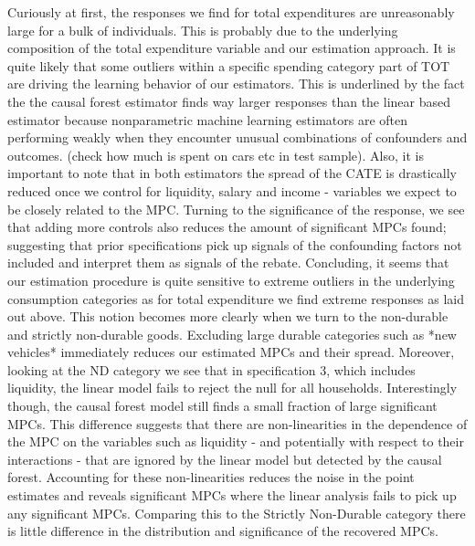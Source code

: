 Curiously at first, the responses we find for total expenditures are unreasonably large for a bulk of individuals. This is probably due to the underlying composition of the total expenditure variable and our estimation approach. It is quite likely that some outliers within a specific spending category part of TOT are driving the learning behavior of our estimators. This is underlined by the fact the the causal forest estimator finds way larger responses than the linear based estimator because nonparametric machine learning estimators are often performing weakly when they encounter unusual combinations of confounders and outcomes. (check how much is spent on cars etc in test sample). Also, it is important to note that in both estimators the spread of the CATE is drastically reduced once we control for liquidity, salary and income - variables we expect to be closely related to the MPC. Turning to the significance of the response, we see that adding more controls also reduces the amount of significant MPCs found; suggesting that prior specifications pick up signals of the confounding factors not included and interpret them as signals of the rebate. Concluding, it seems that our estimation procedure is quite sensitive to extreme outliers in the underlying consumption categories as for total expenditure we find extreme responses as laid out above. This notion becomes more clearly when we turn to the non-durable and strictly non-durable goods. Excluding large durable categories such as *new vehicles* immediately reduces our estimated MPCs and their spread. Moreover, looking at the ND category we see that in specification 3, which includes liquidity, the linear model fails to reject the null for all households. Interestingly though, the causal forest model still finds a small fraction of large significant MPCs. This difference suggests that there are non-linearities in the dependence of the MPC on the variables such as liquidity - and potentially with respect to their interactions - that are ignored by the linear model but detected by the causal forest. Accounting for these non-linearities reduces the noise in the point estimates and reveals significant MPCs where the linear analysis fails to pick up any significant MPCs. Comparing this to the Strictly Non-Durable category there is little difference in the distribution and significance of the recovered MPCs. 
